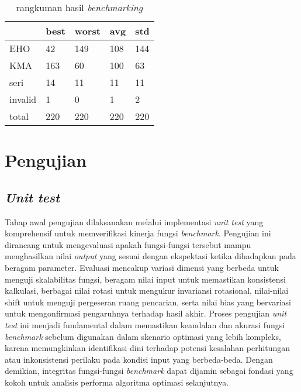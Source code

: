 \begin{table}[h!]
    \centering
    \caption{rangkuman hasil \textit{benchmarking}}
    \begin{tabular}{|l|l|l|l|l|}
    \hline
        & best & worst & avg & std \\ \hline
        EHO & 42 & 149 & 108 & 144 \\ \hline
        KMA & 163 & 60 & 100 & 63 \\ \hline
        seri & 14 & 11 & 11 & 11 \\ \hline
        invalid & 1 & 0 & 1 & 2 \\ \hline
        total & 220 & 220 & 220 & 220 \\ \hline
    \end{tabular}
    \label{summary-result}
\end{table}

\section{Pengujian}
\subsection{\textit{Unit test}}
Tahap awal pengujian dilaksanakan melalui implementasi \textit{unit test} yang komprehensif untuk memverifikasi kinerja fungsi \textit{benchmark}. Pengujian ini dirancang untuk mengevaluasi apakah fungsi-fungsi tersebut mampu menghasilkan nilai \textit{output} yang sesuai dengan ekspektasi ketika dihadapkan pada beragam parameter. Evaluasi mencakup variasi dimensi yang berbeda untuk menguji skalabilitas fungsi, beragam nilai input untuk memastikan konsistensi kalkulasi, berbagai nilai rotasi untuk mengukur invariansi rotasional, nilai-nilai shift untuk menguji pergeseran ruang pencarian, serta nilai bias yang bervariasi untuk mengonfirmasi pengaruhnya terhadap hasil akhir. Proses pengujian \textit{unit test} ini menjadi fundamental dalam memastikan keandalan dan akurasi fungsi \textit{benchmark} sebelum digunakan dalam skenario optimasi yang lebih kompleks, karena memungkinkan identifikasi dini terhadap potensi kesalahan perhitungan atau inkonsistensi perilaku pada kondisi input yang berbeda-beda. Dengan demikian, integritas fungsi-fungsi \textit{benchmark} dapat dijamin sebagai fondasi yang kokoh untuk analisis performa algoritma optimasi selanjutnya.



